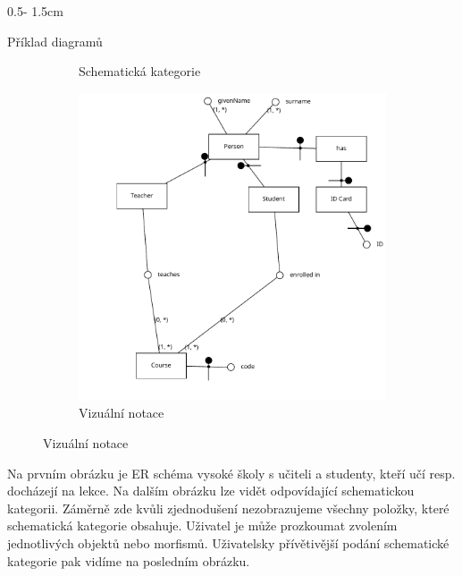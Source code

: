 \documentclass[a0paper]{uioposter}
\begin{document}
\begin{frame}
\begin{columns}[onlytextwidth]
\begin{column}{0.5\textwidth - 1.5cm}
\begin{block}{Příklad diagramů}
\begin{figure}
\begin{subfigure}{0.45\textwidth}
            \caption*{Schematická kategorie}
          \end{subfigure}
          \begin{subfigure}{0.5\textwidth}
            \includegraphics[width=\textwidth]{./images/university-scv.pdf}
            \caption*{Vizuální notace}
          \end{subfigure}
        \end{figure}

        Na prvním obrázku je ER schéma vysoké školy s učiteli a studenty, kteří učí resp. docházejí na lekce.
        Na dalším obrázku lze vidět odpovídající schematickou kategorii.
        Záměrně zde kvůli zjednodušení nezobrazujeme všechny položky, které schematická kategorie obsahuje.
        Uživatel je může prozkoumat zvolením jednotlivých objektů nebo morfismů.
        Uživatelsky přívětivější podání schematické kategorie pak vidíme na posledním obrázku.
      \end{block}
    \end{column}



\end{columns}
\end{frame}
\end{document}
